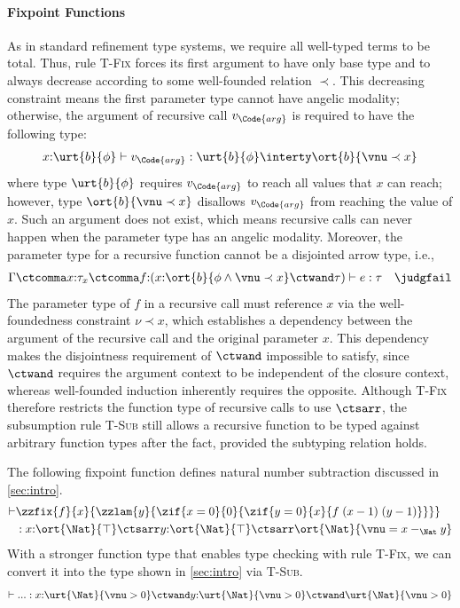 \paragraph{Fixpoint Functions} As in standard refinement type systems,
we require all well-typed terms to be total. Thus, rule \textsc{T-Fix}
forces its first argument to have only base type and to always
decrease according to some well-founded relation $\prec$. This
decreasing constraint means the first parameter type cannot have
angelic modality; otherwise, the argument of recursive call
$v_{\Code{arg}}$ is required to have the following type:
\begin{align*}
  x{:}\urt{b}{\phi} \vdash v_{\Code{arg}} : \urt{b}{\phi} \interty
  \ort{b}{\vnu \prec x}
\end{align*}\noindent
where type $\urt{b}{\phi}$ requires $v_{\Code{arg}}$ to reach all
values that $x$ can reach; however, type $\ort{b}{\vnu \prec x}$
disallows $v_{\Code{arg}}$ from reaching the value of $x$. Such an
argument does not exist, which means recursive calls can never happen
when the parameter type has an angelic modality. Moreover, the
parameter type for a recursive function cannot be a disjointed arrow
type, i.e.,
\begin{align*}
  \Gamma \ctcomma x{:}\tau_x \ctcomma f{:}(x{:}\ort{b}{\phi \land \vnu \prec x} \ctwand \tau) \vdash e : \tau \quad \judgfail
\end{align*}\noindent
The parameter type of $f$ in a recursive call must reference $x$ via
the well-foundedness constraint $\nu \prec x$, which establishes a
dependency between the argument of the recursive call and the original
parameter $x$.  This dependency makes the disjointness requirement of
$\ctwand$ impossible to satisfy, since $\ctwand$ requires the argument
context to be independent of the closure context, whereas well-founded
induction inherently requires the opposite. Although \textsc{T-Fix}
therefore restricts the function type of recursive calls to use $\ctsarr$,
the subsumption rule \textsc{T-Sub} still allows a recursive function
to be typed against arbitrary function types after the fact, provided
the subtyping relation holds.

\begin{example} The following fixpoint function defines natural number subtraction discussed in \autoref{sec:intro}.
\begin{align*}
  \vdash &\zzfix{f}{x}{\zzlam{y}{\zif{x = 0}{0}{\zif{y = 0}{x}{f\;(x - 1)\;(y - 1)}}}}
  \\& : x{:}\ort{\Nat}{\top} \ctsarr y{:}\ort{\Nat}{\top} \ctsarr \ort{\Nat}{\vnu = x -_{\Nat} y}
\end{align*}\noindent
With a stronger function type that enables type checking with rule \textsc{T-Fix}, we can convert it into the type shown in \autoref{sec:intro} via  \textsc{T-Sub}.
\begin{align*}
  \vdash ... :  x{:}\urt{\Nat}{\vnu > 0} \ctwand y{:}\urt{\Nat}{\vnu > 0} \ctwand \urt{\Nat}{\vnu > 0}
\end{align*}\noindent
\end{example}

